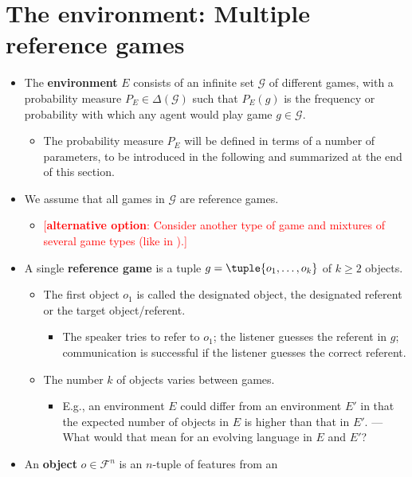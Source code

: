 \documentclass[fleqn,reqno,12pt]{article}
\newcommand{\optional}[1]{\textcolor{Red}{[\textbf{alternative option}: #1]}}
\begin{document}
\section{The environment: Multiple reference games}
\label{sec:mult-refer-games}

\begin{itemize}
\item The \textbf{environment} $E$ consists of an infinite set $\mathcal{G}$ of different
  games, with a probability measure $P_E \in \Delta(\mathcal{G})$ such that $P_E(g)$ is the
  frequency or probability with which any agent would play game $g \in \mathcal{G}$.
  \begin{itemize}
  \item The probability measure $P_E$ will be defined in terms of a number of parameters, to be
    introduced in the following and summarized at the end of this section.
  \end{itemize}
\item We assume that all games in $\mathcal{G}$ are reference games.
  \begin{itemize}
  \item \optional{Consider another type of game and mixtures of several game types (like in \citet{Franke2012:Scales-Salience}).}
  \end{itemize}
\item A single \textbf{reference game} is a tuple $g = \tuple{o_1, \dots, o_k}$ of $k \ge 2$
  objects. 
  \begin{itemize}
  \item The first object $o_1$ is called the designated object, the designated referent or the
    target object/referent.
    \begin{itemize}
    \item The speaker tries to refer to $o_1$; the listener guesses the referent in $g$;
      communication is successful if the listener guesses the correct referent.
    \end{itemize}
  \item The number $k$ of objects varies between games.
    \begin{itemize}
    \item E.g., an environment $E$ could differ from an environment $E'$ in that the expected
      number of objects in $E$ is higher than that in $E'$. --- What would that mean for an
      evolving language in $E$ and $E'$?
    \end{itemize}
  \end{itemize}
\item An \textbf{object} $o \in \mathcal{F}^n$ is an $n$-tuple of features from an

\end{itemize}
\end{document}
